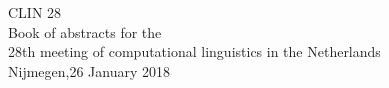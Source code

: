 \hspace{0pt}
\vspace{\fill}
\begin{center}
  {\Huge CLIN 28}\\[2em]

  Book of abstracts for the \\ 28th meeting of computational linguistics in the Netherlands \\[5cm]

  Nijmegen,26 January 2018
\end{center}
\vspace{\fill}
\hspace{0pt}